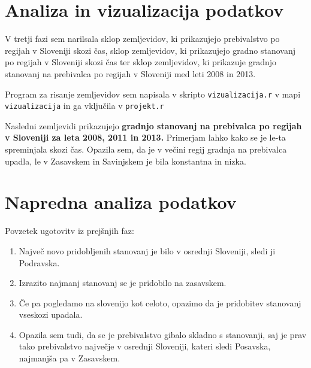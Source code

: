 \documentclass[11pt,a4paper]{article}
\begin{document}
\makebox[\textwidth][c]{

}

\newpage
\section{Analiza in vizualizacija podatkov}

V tretji fazi sem narilsala sklop zemljevidov, ki prikazujejo prebivalstvo po regijah v Sloveniji skozi čas, sklop zemljevidov, ki prikazujejo gradno stanovanj po regijah v Sloveniji skozi čas ter sklop zemljevidov, ki prikazuje gradnjo stanovanj na prebivalca po regijah v Sloveniji med leti 2008 in 2013.

Program za risanje zemljevidov sem napisala v skripto \verb|vizualizacija.r| v mapi \verb|vizualizacija| in ga vključila v \verb|projekt.r|

\newpage
Nasledni zemljevidi prikazujejo \textbf{gradnjo stanovanj na prebivalca po regijah v Sloveniji za leta 2008, 2011 in 2013.} Primerjam lahko kako se je le-ta spreminjala skozi čas. Opazila sem, da je v večini regij gradnja na prebivalca upadla, le v Zasavskem in Savinjskem je bila konstantna in nizka.

\vspace{5mm}
\vspace{5mm}

\section{Napredna analiza podatkov}

Povzetek ugotovitv iz prejšnjih faz:
\begin{enumerate} 
\item{Največ novo pridobljenih stanovanj je bilo v osrednji Sloveniji, sledi ji Podravska.}
\item{Izrazito najmanj stanovanj se je pridobilo na zasavskem.}
\item{Če pa pogledamo na slovenijo kot celoto, opazimo da je pridobitev stanovanj vseskozi upadala.}
\item{Opazila sem tudi, da se je prebivalstvo gibalo skladno s stanovanji, saj je prav tako prebivalstvo največje v osrednji Sloveniji, kateri sledi Posavska, najmanjša pa v Zasavskem.}
\end{enumerate}
\end{document}
